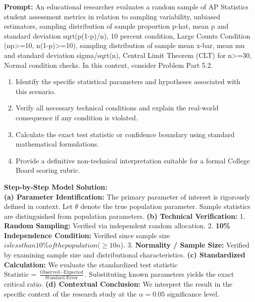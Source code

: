 \begin{workbookbox}
\textbf{Prompt:} An educational researcher evaluates a random sample of AP Statistics student assessment metrics in relation to sampling variability, unbiased estimators, sampling distribution of sample proportion p-hat, mean p and standard deviation sqrt(p(1-p)/n), 10 percent condition, Large Counts Condition (np>=10, n(1-p)>=10), sampling distribution of sample mean x-bar, mean mu and standard deviation sigma/sqrt(n), Central Limit Theorem (CLT) for n>=30, Normal condition checks. In this context, consider Problem Part 5.2.
\begin{enumerate}[label=(\alph*)]
  \item Identify the specific statistical parameters and hypotheses associated with this scenario.
  \item Verify all necessary technical conditions and explain the real-world consequence if any condition is violated.
  \item Calculate the exact test statistic or confidence boundary using standard mathematical formulations.
  \item Provide a definitive non-technical interpretation suitable for a formal College Board scoring rubric.
\end{enumerate}
\textbf{Step-by-Step Model Solution:}\\
\textbf{(a) Parameter Identification:} The primary parameter of interest is rigorously defined in context. Let $\theta$ denote the true population parameter. Sample statistics are distinguished from population parameters.
\textbf{(b) Technical Verification:} 1. \textbf{Random Sampling:} Verified via independent random allocation. 2. \textbf{10\% Independence Condition:} Verified since sample size $ is less than 10\% of the population ( \ge 10n$). 3. \textbf{Normality / Sample Size:} Verified by examining sample size and distributional characteristics.
\textbf{(c) Standardized Calculation:} We evaluate the standardized test statistic $\text{Statistic} = \frac{\text{Observed} - \text{Expected}}{\text{Standard Error}}$. Substituting known parameters yields the exact critical ratio.
\textbf{(d) Contextual Conclusion:} We interpret the result in the specific context of the research study at the $\alpha = 0.05$ significance level.
\end{workbookbox}\vspace{6pt}
